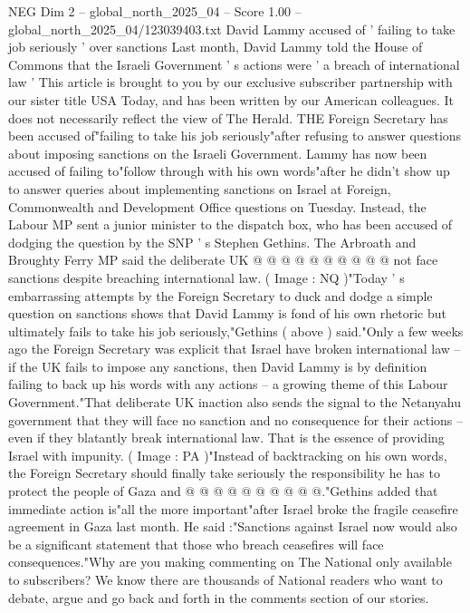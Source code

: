 \begin{textsample}{NEG Dim 2 – global\_north\_2025\_04 – Score 1.00 – global\_north\_2025\_04/123039403.txt}  \label{ex:f2_neg_121}
David Lammy accused of ' failing to take job seriously ' over sanctions Last month, David Lammy told the House of Commons that the Israeli Government ' s actions were ' a breach of international law ' This article is brought to you by our exclusive subscriber partnership with our sister title USA Today, and has been written by our American colleagues.
It does not necessarily reflect the view of The Herald.
THE Foreign Secretary has been accused of"failing to take his job seriously"after refusing to answer questions about imposing sanctions on the Israeli Government.
Lammy has now been accused of failing to"follow through with his own words"after he didn't show up to answer queries about implementing sanctions on Israel at Foreign, Commonwealth and Development Office questions on Tuesday.
Instead, the Labour MP sent a junior minister to the dispatch box, who has been accused of dodging the question by the SNP ' s Stephen Gethins.
The Arbroath and Broughty Ferry MP said the deliberate UK @ @ @ @ @ @ @ @ @ @ not face sanctions despite breaching international law. ( Image : NQ )"Today ' s embarrassing attempts by the Foreign Secretary to duck and dodge a simple question on sanctions shows that David Lammy is fond of his own rhetoric but ultimately fails to take his job seriously,"Gethins ( above ) said."Only a few weeks ago the Foreign Secretary was explicit that Israel have broken international law -- if the UK fails to impose any sanctions, then David Lammy is by definition failing to back up his words with any actions -- a growing theme of this Labour Government."That deliberate UK inaction also sends the signal to the Netanyahu government that they will face no sanction and no consequence for their actions -- even if they blatantly break international law.
That is the essence of providing Israel with impunity. ( Image : PA )"Instead of backtracking on his own words, the Foreign Secretary should finally take seriously the responsibility he has to protect the people of Gaza and @ @ @ @ @ @ @ @ @ @."Gethins added that immediate action is"all the more important"after Israel broke the fragile ceasefire agreement in Gaza last month.
He said :"Sanctions against Israel now would also be a significant statement that those who breach ceasefires will face consequences."Why are you making commenting on The National only available to subscribers?
We know there are thousands of National readers who want to debate, argue and go back and forth in the comments section of our stories.

\end{textsample}
